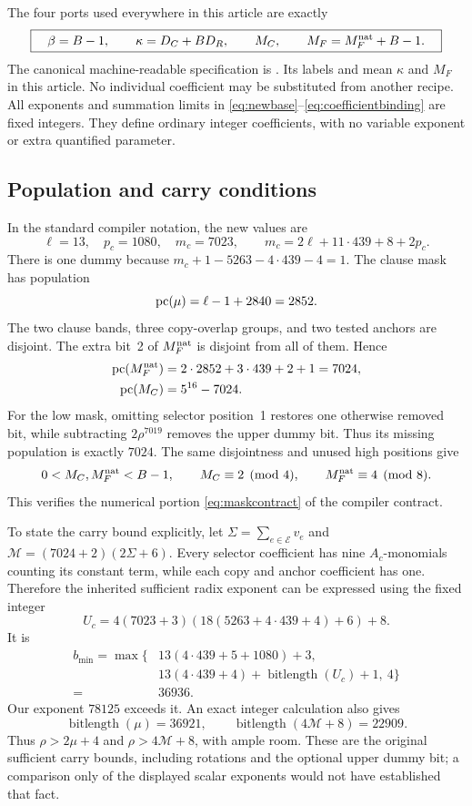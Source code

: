 The four ports used everywhere in this article are exactly
\begin{equation}
 \boxed{\quad\beta=B-1,\qquad \kappa=D_C+BD_R,\qquad
 M_C,\qquad M_F=M_F^{\rm nat}+B-1.\quad}
 \label{eq:coefficientbinding}
\end{equation}
The canonical machine-readable specification is
.  Its labels  and
 mean $\kappa$ and $M_F$ in this article.
No individual coefficient may be substituted from another recipe.
All exponents and summation limits in
\eqref{eq:newbase}--\eqref{eq:coefficientbinding} are fixed integers.
They define ordinary integer coefficients, with no variable exponent
or extra quantified parameter.

\subsection{Population and carry conditions}

In the standard compiler notation, the new values are
\[
 \ell=13,\quad p_c=1080,\quad m_c=7023,
 \qquad m_c=2\ell+11\cdot439+8+2p_c.
\]
There is one dummy because
$m_c+1-5263-4\cdot439-4=1$.  The clause mask has population
\[
 \operatorname{pc}(\mu)=\ell-1+2840=2852.
\]
The two clause bands, three copy-overlap groups, and two tested anchors
are disjoint.  The extra bit~2 of $M_F^{\rm nat}$ is disjoint from all
of them.  Hence
\begin{align}
 \operatorname{pc}(M_F^{\rm nat})&=2\cdot2852+3\cdot439+2+1=7024,\notag\\
 \operatorname{pc}(M_C)&=5^{16}-7024.\label{eq:newpopulation}
\end{align}
For the low mask, omitting selector position~1 restores one otherwise
removed bit, while subtracting $2\rho^{7019}$ removes the upper dummy
bit.  Thus its missing population is exactly $7024$.  The same
disjointness and unused high positions give
\[
 0<M_C,M_F^{\rm nat}<B-1,\qquad
 M_C\equiv2\pmod4,\qquad M_F^{\rm nat}\equiv4\pmod8.
\]
This verifies the numerical portion \eqref{eq:maskcontract} of the
compiler contract.

To state the carry bound explicitly, let
$\Sigma=\sum_{e\in\mathcal E}v_e$ and
$\mathcal M=(7024+2)(2\Sigma+6)$.  Every selector coefficient has
nine $A_c$-monomials counting its constant term, while each copy and
anchor coefficient has one.  Therefore the inherited sufficient radix
exponent can be expressed using the fixed integer
\[
 U_c=4(7023+3)(18(5263+4\cdot439+4)+6)+8.
\]
It is
\begin{align*}
 b_{\min}=\max\{&13(4\cdot439+5+1080)+3,\\
 &13(4\cdot439+4)+\operatorname{bitlength}(U_c)+1,\ 4\}\\
 ={}&36936.
\end{align*}
Our exponent $78125$ exceeds it.  An exact integer calculation also
gives
\[
 \operatorname{bitlength}(\mu)=36921,\qquad
 \operatorname{bitlength}(4\mathcal M+8)=22909.
\]
Thus $\rho>2\mu+4$ and $\rho>4\mathcal M+8$, with ample room.  These
are the original sufficient carry bounds, including rotations and the
optional upper dummy bit; a comparison only of the displayed scalar
exponents would not have established that fact.

